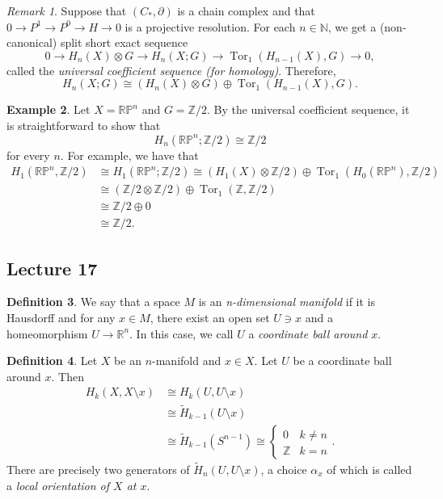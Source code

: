 \documentclass[10pt,letterpaper,cm]{nupset}
\theoremstyle{definition}
\newtheorem{definition}{Definition}[subsection]
\newtheorem{exmp}[definition]{Example}
\theoremstyle{theorem}
\theoremstyle{remark}
\newtheorem{remark}[definition]{Remark}
\newcommand{\N}{\mathbb N}
\newcommand{\R}{\mathbb{R}}
\newcommand{\RP}{\mathbb{RP}}
\newcommand{\Z}{\mathbb Z}
\newcommand{\1}{\mathbb{1}}
\newcommand{\0}{\vec 0}
\DeclareMathOperator{\tor}{Tor}
\begin{document}
\begin{remark}
Suppose that $(C_{\ast}, \partial)$ is a chain complex and that $0 \to P^1 \to P^0 \to H \to 0$ is a projective resolution. For each $n\in \N$, we get a (non-canonical) split short exact sequence $$0 \to H_n(X) \otimes G \to H_n(X; G) \to \tor_1(H_{n-1}(X), G) \to 0    ,$$ called the \textit{universal coefficient sequence (for homology)}. Therefore, $$H_n(X; G) \cong (H_n(X) \otimes G)  \oplus  \tor_1(H_{n-1}(X), G).$$
\end{remark}

\begin{exmp}
Let $X= \RP^n$ and $G= \Z/2$. By the universal coefficient sequence, it is straightforward to show that $$H_n(\RP^n; \Z/2) \cong \Z/2 $$ for every $n$. For example, we have that
\begin{align*}
H_1(\RP^n, \Z/2) & \cong H_1(\RP^n; \Z/2) \cong (H_1(X) \otimes \Z/2)  \oplus  \tor_1(H_0(\RP^n), \Z/2)
\\ & \cong (\Z/2 \otimes \Z/2)  \oplus  \tor_1(\Z, \Z/2)
\\ & \cong \Z/2 \oplus 0
\\ & \cong \Z/2.
\end{align*}
\end{exmp}

\subsection{Lecture 17}

\begin{definition}
We say that a space $M$ is an \textit{n-dimensional manifold} if it is Hausdorff and for any $x\in M$, there exist an open set $U \ni x$ and a homeomorphism $U \to \R^n$. In this case, we call $U$ a \textit{coordinate ball around $x$}.
\end{definition}

\begin{definition}
Let $X$ be an $n$-manifold and $x\in X$. Let $U$ be a coordinate ball around $x$. Then 
\begin{align*} 
 {H}_k(X, X \setminus x) & \cong {H}_k(U, U \setminus x)  \\ &   \cong \widetilde{H}_{k-1}(U\setminus x) \\ & \cong  \widetilde{H}_{k-1}(S^{n-1})  \cong \begin{cases} 0 & k \ne n \\ \Z & k =n \end{cases}.\end{align*} There are precisely two generators of  $\widetilde{H}_n(U, U \setminus x)$, a choice $\alpha_x$ of which is called a \textit{local orientation of $X$ at $x$}.
\end{definition}
\end{document}
